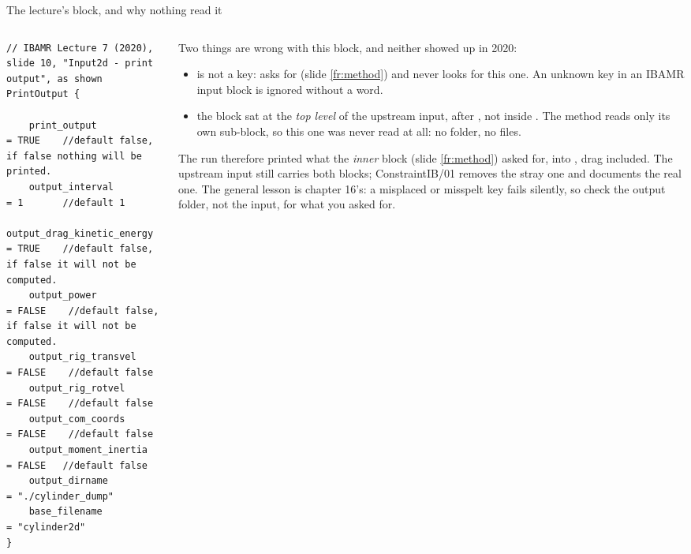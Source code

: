 \documentclass[aspectratio=169,11pt]{beamer}
\begin{document}
\begin{frame}[fragile]{The lecture's  block, and why nothing read it}
\label{fr:method2}
\begin{columns}[T,onlytextwidth]
\begin{column}{0.5\textwidth}
\begin{lstlisting}[style=inputtiny]
// IBAMR Lecture 7 (2020), slide 10, "Input2d - print output", as shown
PrintOutput {

    print_output                = TRUE    //default false, if false nothing will be printed.
    output_interval             = 1       //default 1
    output_drag_kinetic_energy  = TRUE    //default false, if false it will not be computed.
    output_power                = FALSE    //default false, if false it will not be computed.
    output_rig_transvel         = FALSE    //default false
    output_rig_rotvel           = FALSE    //default false
    output_com_coords           = FALSE    //default false
    output_moment_inertia       = FALSE   //default false
    output_dirname              = "./cylinder_dump"
    base_filename               = "cylinder2d"
}
\end{lstlisting}
\end{column}
\begin{column}{0.48\textwidth}
\scriptsize Two things are wrong with this block, and neither showed up in 2020:
\begin{itemize}
  \item {} is not a key:  asks for  (slide \ref{fr:method}) and never looks for this one. An unknown key in an IBAMR input block is ignored without a word.
  \item the block sat at the \emph{top level} of the upstream input, after , not inside . The method reads only its own sub-block, so this one was never read at all: no  folder, no  files.
\end{itemize}
\scriptsize The run therefore printed what the \emph{inner} block (slide \ref{fr:method}) asked for, into , drag included. The upstream input still carries both blocks; ConstraintIB/01 removes the stray one and documents the real one. The general lesson is chapter 16's: a misplaced or misspelt key fails silently, so check the output folder, not the input, for what you asked for.
\end{column}
\end{columns}
\end{frame}
\end{document}
